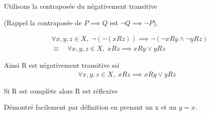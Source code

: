 \documentclass[a4paper, 12pt]{article}
\begin{document}
\begin{demonstration}
    Utilisons la contraposée du négativement transitive \par (Rappel la contraposée de $P \implies Q$ est $\neg Q \implies \neg P$),

    \begin{align*}
        &\forall x, y, z \in X, \; \neg(\neg(xRz)) \implies \neg(\neg xRy \land \neg yRz) \\
        &\equiv \quad \forall x, y, z \in X, \; xRz \implies xRy \lor yRz
    \end{align*}

    \begin{rdem}
        Ainsi R est négativement transitive ssi
        \begin{align*}
            \forall x, y, z \in X, \; xRz \implies xRy \lor yRz
        \end{align*}
    \end{rdem}
\end{demonstration}

\begin{proposition}
    Si R est complète alors R est réflexive 
\end{proposition}
Démontré facilement par définition en prenant un x et un $y = x$.
\end{document}
